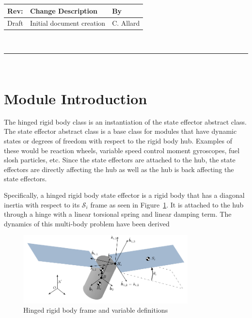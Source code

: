 \documentclass[]{BasiliskReportMemo}
\begin{document}
\makeCover
%
%
\pagestyle{empty}
{\renewcommand{\arraystretch}{1.1}
\noindent
\begin{longtable}{|p{0.5in}|p{4.5in}|p{1.14in}|}
\hline
{\bfseries Rev}: & {\bfseries Change Description} & {\bfseries By} \\
\hline
Draft & Initial document creation & C. Allard \\
\hline

\end{longtable}
}

\newpage
\setcounter{page}{1}
\pagestyle{fancy}

\tableofcontents
~\\ \hrule ~\\



\section{Module Introduction}
The hinged rigid body class is an instantiation of the state effector abstract class. The state effector abstract class is a base class for modules that have dynamic states or degrees of freedom with respect to the rigid body hub. Examples of these would be reaction wheels, variable speed control moment gyroscopes, fuel slosh particles, etc. Since the state effectors are attached to the hub, the state effectors are directly affecting the hub as well as the hub is back affecting the state effectors.

Specifically, a hinged rigid body state effector is a rigid body that has a diagonal inertia with respect to its $\mathcal{S}_i$ frame as seen in Figure~\ref{fig:FlexFigure}. It is attached to the hub through a hinge with a linear torsional spring and linear damping term. The dynamics of this multi-body problem have been derived 

\begin{figure}[htbp]
	\centerline{
		\includegraphics[width=0.8\textwidth]{Figures/Fig4_4_2}}
	\caption{Hinged rigid body frame and variable definitions}
	\label{fig:FlexFigure}
\end{figure}
\end{document}
